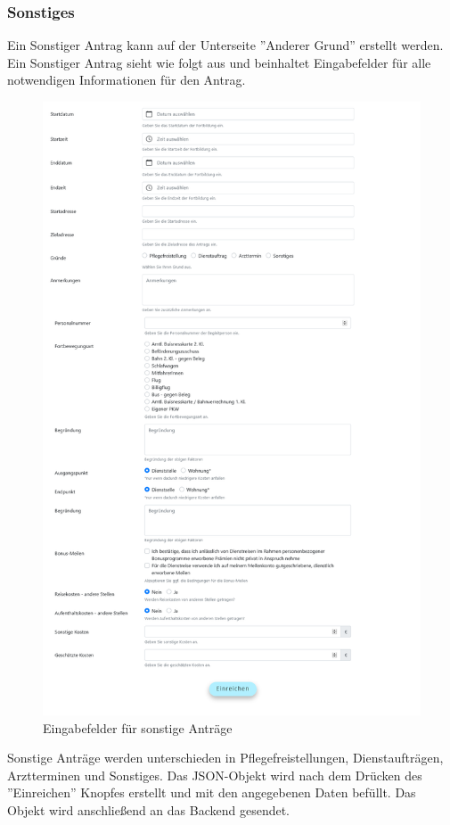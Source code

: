 \subsubsection{Sonstiges}
Ein Sonstiger Antrag kann auf der Unterseite ''Anderer Grund'' erstellt werden. Ein Sonstiger Antrag sieht wie folgt aus und beinhaltet Eingabefelder für alle notwendigen Informationen für den Antrag.
\begin{figure}[H]
	\centering
	\includegraphics[width=0.75\linewidth]{images/othercause}
	\caption[Sonstiger Antrag]{Eingabefelder für sonstige Anträge}
	\label{fig:othercause}
\end{figure}
Sonstige Anträge werden unterschieden in Pflegefreistellungen, Dienstaufträgen, Arztterminen und Sonstiges. Das JSON-Objekt wird nach dem Drücken des ''Einreichen'' Knopfes erstellt und mit den angegebenen Daten befüllt. Das Objekt wird anschließend an das Backend gesendet.\\

